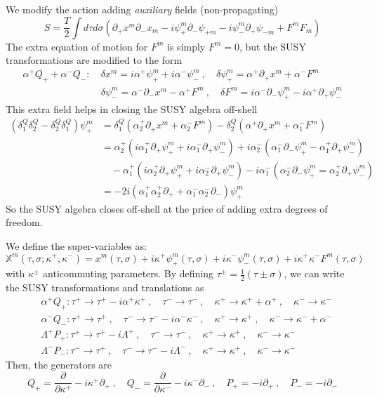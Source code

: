 \documentclass[a4paper,12pt]{article}
\numberwithin{equation}{section}
\numberwithin{exe}{section}
\newcommand{\X}{{\mathbb X}}
\newcommand{\p}{{\partial}}
\renewcommand{\a}{{\alpha}}
\renewcommand{\d}{{\delta}}
\renewcommand{\k}{{\kappa}}
\renewcommand{\L}{{\Lambda}}
\newcommand{\s}{{\sigma}}
\begin{document}
We modify the action adding {\it auxiliary} fields (non-propagating)
	\begin{equation}\label{stringaction}
	S = \frac{T}{2} \int d\tau d\s (\p_+ x^m \p_- x_m - i \psi^m_+ \p_- \psi_{+m} - i\psi^m_- \p_+ \psi_{-m} + F^m F_m)
	\end{equation}
The extra equation of motion for $F^m$ is simply $F^m = 0$, but the SUSY transformations are modified to the form
	\begin{equation}
		\begin{aligned}
		\a^+ Q_+ + \a^- Q_-:\ &\d x^m = i\a^+ \psi^m_+ + i\a^- \psi^m_-\ ,\quad \d\psi^m_+ = \a^+ \p_+ x^m + \a^- F^m \\
		& \d\psi^m_- = \a^- \p_- x^m - \a^+ F^m\ ,\quad \d F^m = i\a^- \p_-\psi^m_+ -i\a^+ \p_+ \psi^m_-
		\end{aligned}
	\end{equation}
This extra field helps in closing the SUSY algebra off-shell
	\begin{align}
	(\d^Q_1 \d^Q_2 - \d^Q_2\d^Q_1) \psi^m_+ & = \d^Q_1 (\a^+_2 \p_+ x^m + \a^-_2 F^m) - \d^Q_2 (\a^+\p_+ x^m + \a^-_1 F^m) \nonumber \\
	& = \a^+_2 (i\a^+_1 \p_+ \psi^m_+ + i\a^-_1 \p_+ \psi^m_-) + i\a^-_2 (\a^-_1 \p_-\psi^m_+ - \a^+_1 \p_+ \psi^m_-) \nonumber \\
	& \quad - \a^+_1 (i\a^+_2 \p_+ \psi^m_+ + i\a^-_2 \p_+ \psi^m_-) -i\a^-_1 (\a^-_2 \p_-\psi^m_+ = \a^+_2 \p_+\psi^m_-) \nonumber \\
	& = -2i (\a^+_1 \a^+_2 \p_+ + \a^-_1 \a^-_2 \p_-)\psi^m_+
	\end{align}
So the SUSY algebra closes off-shell at the price of adding extra degrees of freedom.

We define the super-variables as:
	\begin{equation}
	\X^m (\tau,\s;\k^+,\k^-) = x^m(\tau,\s) + i\k^+\psi^m_+(\tau,\s) + i\k^-\psi^m_-(\tau,\s) + i\k^+\k^- F^m(\tau,\s)
	\end{equation}
with $\k^\pm$ anticommuting parameters. By defining $\tau^\pm = \frac12 (\tau \pm\s)$, we can write the SUSY transformations and translations as
	\begin{align}
	&\a^+ Q_+: \tau^+\rightarrow \tau^+ - i\a^+\k^+\ ,\quad \tau^-\rightarrow \tau^-\ ,\quad \k^+\rightarrow \k^+ +\a^+\ ,\quad\k^-\rightarrow \k^- \\
	&\a^- Q_-: \tau^+\rightarrow \tau^+\ ,\quad \tau^-\rightarrow \tau^--i\a^-\k^-\ ,\quad \k^+\rightarrow \k^+\ ,\quad \k^-\rightarrow \k^-+\a^- \\
	&\L^+ P_+: \tau^+\rightarrow \tau^+-i\L^+\ ,\quad \tau^-\rightarrow \tau^-\ ,\quad \k^+\rightarrow \k^+\ ,\quad \k^-\rightarrow \k^- \\
	&\L^- P_-: \tau^-\rightarrow \tau^+\ ,\quad \tau^-\rightarrow \tau^--i\L^-\ ,\quad \k^+\rightarrow \k^+\ ,\quad \k^-\rightarrow \k^-
	\end{align}
Then, the generators are
	\begin{equation}\label{susygens}
	Q_+ = \frac{\p}{\p\k^+}-i\k^+\p_+\ ,\quad Q_-= \frac{\p}{\p\k^-}-i\k^-\p_-\ ,\quad P_+=-i\p_+\ ,\quad P_- = -i\p_-
	\end{equation}
\end{document}
